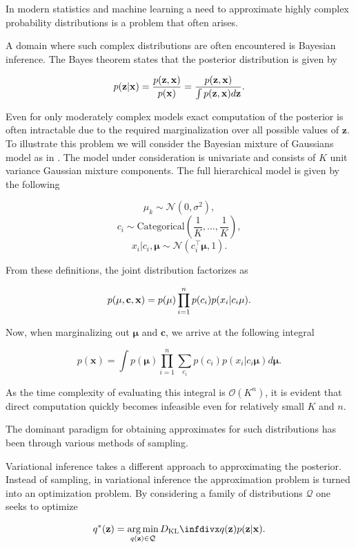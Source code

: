 In modern statistics and machine learning a need to approximate highly complex probability distributions is a problem that often arises.

A domain where such complex distributions are often encountered is Bayesian inference. The Bayes theorem states that the posterior distribution is given by

$$p(\mathbf{z} \vert \mathbf{x}) = \frac{p(\mathbf{z}, \mathbf{x})}{p(\mathbf{x})} = \frac{p(\mathbf{z}, \mathbf{x})}{\int p(\mathbf{z}, \mathbf{x}) d\mathbf{z}}.$$

Even for only moderately complex models exact computation of the posterior is often intractable due to the required marginalization over all possible values of $\mathbf{z}$. To illustrate this problem we will consider the Bayesian mixture of Gaussians model as in \cite{variational_inference_review}. The model under consideration is univariate and consists of $K$ unit variance Gaussian mixture components. The full hierarchical model is given by the following

$$\mu_k \sim \mathcal{N}(0, \sigma^2),$$
$$c_i \sim \text{Categorical}(\frac{1}{K}, \dotsc, \frac{1}{K}),$$
$$x_i \vert c_i, \mathbf{\mu} \sim \mathcal{N}(c^{\top}_i \mathbf{\mu}, 1).$$

From these definitions, the joint distribution factorizes as

$$p(\mathbf{\mu}, \mathbf{c}, \mathbf{x}) = p(\mathbf{\mu}) \prod_{i=1}^{n} p(c_i) p(x_i \vert c_i \mathbf{\mu}).$$

Now, when marginalizing out $\mathbf{\mu}$ and $\mathbf{c}$, we arrive at the following integral

$$p(\mathbf{x}) = \int p(\mathbf{\mu}) \prod_{i=1}^{n} \sum_{c_i} p(c_i) p(x_i \vert c_i \mathbf{\mu}) d\mathbf{\mu}.$$

As the time complexity of evaluating this integral is $\mathcal{O}(K^n)$, it is evident that direct computation quickly becomes infeasible even for relatively small $K$ and $n$.

The dominant paradigm for obtaining approximates for such distributions has been through various methods of sampling. 

Variational inference takes a different approach to approximating the posterior. Instead of sampling, in variational inference the approximation problem is turned into an optimization problem. By considering a family of distributions $\mathcal{Q}$ one seeks to optimize

$$q^{*}(\mathbf{z}) = \argmin_{q(\mathbf{z}) \in \mathcal{Q}} \dkl{q(\mathbf{z})}{p(\mathbf{z} \vert \mathbf{x})}.$$

